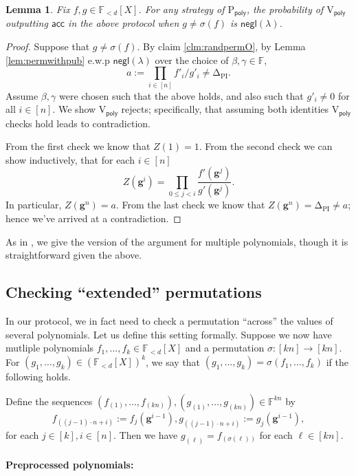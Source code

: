 \documentclass[11pt]{article} %
\newcommand{\F}{\ensuremath{\mathbb F}\xspace}
\newcommand{\sigof}[1]{\ensuremath{\sigma(#1)}\xspace}
\newcommand{\pubinputdelta}{\ensuremath{\mathrm{\Delta_{\mathrm{PI}}}}\xspace}
\newcommand{\negl}{\ensuremath{\mathsf{negl}(\lambda)}\xspace}
\newcommand{\acc}{\ensuremath{\mathsf{acc}}\xspace}
\newcommand{\defeq}{:=}
\newcommand{\prvpoly}{\ensuremath{\mathrm{P_{\mathsf{poly}}}}\xspace}
\newcommand{\verpoly}{\ensuremath{\mathrm{V_{\mathsf{poly}}}}\xspace}
\newcommand{\hgen}{\ensuremath{\mathbf{g}}\xspace}
\newcommand{\polysofdeg}[1]{\ensuremath{\F_{< #1}[X]}\xspace}
\newtheorem{lemma}{Lemma}[section]
\begin{document}
\begin{lemma}\label{lem:permprotocol}
Fix $f,g \in \polysofdeg{d}$.
For any strategy of \prvpoly, the probability of \verpoly outputting \acc in the above protocol when $g\neq \sigof{f}$ is \negl.
\end{lemma}
\begin{proof}
 Suppose that $g\neq \sigof{f}$. By claim \ref{clm:randpermO}, by Lemma \ref{lem:permwithpub} e.w.p \negl over the choice of $\beta,\gamma\in \F$, 
 \[a\defeq \prod_{i\in [n]}f'_i/g'_i \neq \pubinputdelta.\]
 Assume $\beta,\gamma$ were chosen such that the above holds, and also such that $g'_i\neq 0$ for all $i\in [n]$. We show \verpoly rejects; specifically, that assuming both identities \verpoly checks hold leads to contradiction.
 
 From the first check we know that $Z(1) = 1$.
From the second check we can show inductively, that for each $i\in [n]$
\[Z(\hgen^{i}) = \prod_{0\leq j < i} \frac{f'(\hgen^j)}{g'(\hgen^j)}.\]
In particular, $Z(\hgen^{n})=a$.
From the last check we know that $Z(\hgen^n)=\pubinputdelta\neq a$;
hence we've arrived at a contradiction.
\end{proof}



As in \cite{plonk}, we give the version of the argument for multiple polynomials, though it is straightforward given the above.
\subsection{Checking ``extended''  permutations}\label{subsec:extperm}
In our protocol, we in fact need to check a permutation ``across'' the values of several polynomials.
Let us define this setting formally.
Suppose we now have mutliple polynomials $f_1,\ldots,f_k\in \polysofdeg{d}$ and a permutation $\sigma:[kn]\to [kn]$.
For $(g_1,\ldots,g_k)\in \left(\polysofdeg{d}\right)^k$, we say that
$(g_1,\ldots,g_k)=\sigof{f_1,\ldots,f_k}$ if the following holds.

Define the sequences $(f_{(1)},\ldots, f_{(kn)}),(g_{(1)},\ldots,g_{(kn)}) \in \F^{kn}$
by 
\[f_{((j-1)\cdot n + i)} \defeq f_j(\hgen^{i-1}), g_{((j-1)\cdot n + i)} \defeq g_j(\hgen^{i-1}),\]
for each $j\in [k], i\in [n]$.
Then we have $g_{(\ell)} = f_{(\sigma(\ell))}$ for each $\ell \in [kn]$.



\paragraph{Preprocessed polynomials:}
\end{document}
